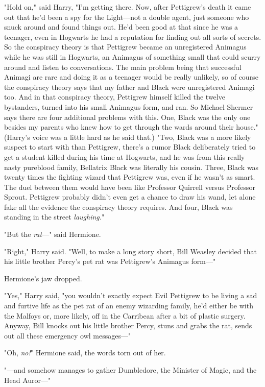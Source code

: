 "Hold on," said Harry, "I'm getting there. Now, after Pettigrew's death it came
out that he'd been a spy for the Light—not a double agent, just someone who
snuck around and found things out. He'd been good at that since he was a
teenager, even in Hogwarts he had a reputation for finding out all sorts of
secrets. So the conspiracy theory is that Pettigrew became an unregistered
Animagus while he was still in Hogwarts, an Animagus of something small that
could scurry around and listen to conversations. The main problem being that
successful Animagi are rare and doing it as a teenager would be really
unlikely, so of course the conspiracy theory says that my father and Black were
unregistered Animagi too. And in that conspiracy theory, Pettigrew himself
killed the twelve bystanders, turned into his small Animagus form, and ran. So
Michael Shermer says there are four additional problems with this. One, Black
was the only one besides my parents who knew how to get through the wards
around their house." (Harry's voice was a little hard as he said that.) "Two,
Black was a more likely suspect to start with than Pettigrew, there's a rumor
Black deliberately tried to get a student killed during his time at Hogwarts,
and he was from this really nasty pureblood family, Bellatrix Black was
literally his cousin. Three, Black was twenty times the fighting wizard that
Pettigrew was, even if he wasn't as smart. The duel between them would have
been like Professor Quirrell versus Professor Sprout. Pettigrew probably didn't
even get a chance to draw his wand, let alone fake all the evidence the
conspiracy theory requires. And four, Black was standing in the street
\emph{laughing.}"

"But the \emph{rat}—" said Hermione.

"Right," Harry said. "Well, to make a long story short, Bill Weasley decided
that his little brother Percy's pet rat was Pettigrew's Animagus form—"

Hermione's jaw dropped.

"Yes," Harry said, "you wouldn't exactly expect Evil Pettigrew to be living a
sad and furtive life as the pet rat of an enemy wizarding family, he'd either
be with the Malfoys or, more likely, off in the Carribean after a bit of
plastic surgery. Anyway, Bill knocks out his little brother Percy, stuns and
grabs the rat, sends out all these emergency owl messages—"

"Oh, \emph{no!}" Hermione said, the words torn out of her.

"—and somehow manages to gather Dumbledore, the Minister of Magic, and the
Head Auror—"

